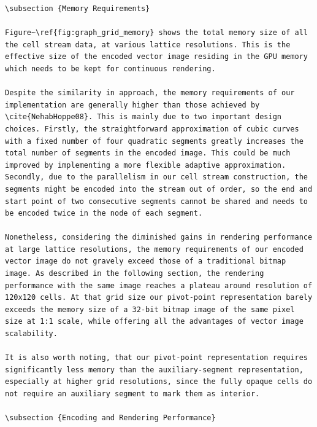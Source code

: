 \documentclass[11pt,a4paper,twoside]{article}
\begin{document}
\begin {verbatim}
\subsection {Memory Requirements}

Figure~\ref{fig:graph_grid_memory} shows the total memory size of all the cell stream data, at various lattice resolutions. This is the effective size of the encoded vector image residing in the GPU memory which needs to be kept for continuous rendering.

Despite the similarity in approach, the memory requirements of our implementation are generally higher than those achieved by \cite{NehabHoppe08}. This is mainly due to two important design choices. Firstly, the straightforward approximation of cubic curves with a fixed number of four quadratic segments greatly increases the total number of segments in the encoded image. This could be much improved by implementing a more flexible adaptive approximation. Secondly, due to the parallelism in our cell stream construction, the segments might be encoded into the stream out of order, so the end and start point of two consecutive segments cannot be shared and needs to be encoded twice in the node of each segment.

Nonetheless, considering the diminished gains in rendering performance at large lattice resolutions, the memory requirements of our encoded vector image do not gravely exceed those of a traditional bitmap image. As described in the following section, the rendering performance with the same image reaches a plateau around resolution of 120x120 cells. At that grid size our pivot-point representation barely exceeds the memory size of a 32-bit bitmap image of the same pixel size at 1:1 scale, while offering all the advantages of vector image scalability.

It is also worth noting, that our pivot-point representation requires significantly less memory than the auxiliary-segment representation, especially at higher grid resolutions, since the fully opaque cells do not require an auxiliary segment to mark them as interior.

\subsection {Encoding and Rendering Performance}


\end{verbatim}
\end{document}
